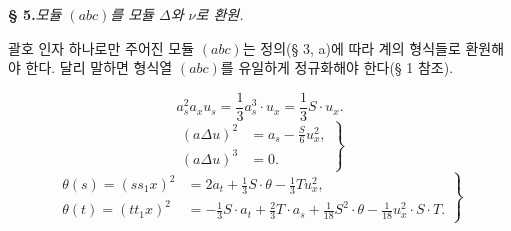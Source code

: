 
\begin{center}
\textbf{§ 5.}\quad\emph{모듈 $(abc)$를 모듈 $\Delta$와 $\nu$로 환원.}
\end{center}

괄호 인자 하나로만 주어진 모듈 $(abc)$는 정의(§ 3, a)에 따라 계의 형식들로 환원해야 한다. 달리 말하면 형식열 $(abc)$를 유일하게 정규화해야 한다(§ 1 참조).

\[
a_s^2a_xu_s=\frac13a_s^3\cdot u_x=\frac13S\cdot u_x. \tag{2.}
\]
\[
\left.
\begin{aligned}
(a\Delta u)^2&=a_s-\frac{S}{6}u_x^2,\\
(a\Delta u)^3&=0.
\end{aligned}
\right\} \tag{3.}
\]
\[
\left.
\begin{aligned}
\theta(s)=(ss_1x)^2&=2a_t+\frac13S\cdot\theta-\frac13Tu_x^2,\\
\theta(t)=(tt_1x)^2&=-\frac13S\cdot a_t+\frac23T\cdot a_s+\frac1{18}S^2\cdot\theta-\frac1{18}u_x^2\cdot S\cdot T.
\end{aligned}
\right\} \tag{4.}
\]
